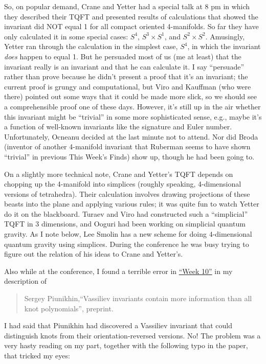 \documentclass[12pt]{article}
\begin{document}
So, on popular demand, Crane and Yetter had a special talk at 8 pm in
which they described their TQFT and presented results of calculations
that showed the invariant did NOT equal 1 for all compact oriented
4-manifolds. So far they have only calculated it in some special cases:
\(S^4\), \(S^3 \times S^1\), and \(S^2 \times S^2\). Amusingly, Yetter
ran through the calculation in the simplest case, \(S^4\), in which the
invariant \emph{does} happen to equal 1. But he persuaded most of us (me
at least) that the invariant really is an invariant and that he can
calculate it. I say ``persuade'' rather than prove because he didn't
present a proof that it's an invariant; the current proof is grungy and
computational, but Viro and Kauffman (who were there) pointed out some
ways that it could be made more slick, so we should see a comprehensible
proof one of these days. However, it's still up in the air whether this
invariant might be ``trivial'' in some more sophisticated sense, e.g.,
maybe it's a function of well-known invariants like the signature and
Euler number. Unfortunately, Ocneanu decided at the last minute not to
attend. Nor did Broda (inventor of another 4-manifold invariant that
Ruberman seems to have shown ``trivial'' in previous This Week's Finds)
show up, though he had been going to.

On a slightly more technical note, Crane and Yetter's TQFT depends on
chopping up the 4-manifold into simplices (roughly speaking,
4-dimensional versions of tetrahedra). Their calculation involves
drawing projections of these beasts into the plane and applying various
rules; it was quite fun to watch Yetter do it on the blackboard. Turaev
and Viro had constructed such a ``simplicial'' TQFT in 3 dimensions, and
Ooguri had been working on simplicial quantum gravity. As I note below,
Lee Smolin has a new scheme for doing \(4\)-dimensional quantum gravity
using simplices. During the conference he was busy trying to figure out
the relation of his ideas to Crane and Yetter's.

Also while at the conference, I found a terrible error in
\protect\hyperlink{week10}{``Week 10''} in my description of

\begin{quote}
{\rm Sergey Piunikhin,``Vassiliev invariants contain more information than all knot
polynomials'', preprint.}
\end{quote}

I had said that Piunikhin had discovered a Vassiliev invariant that
could distinguish knots from their orientation-reversed versions. No!
The problem was a very hasty reading on my part, together with the
following typo in the paper, that tricked my eyes:
\end{document}
